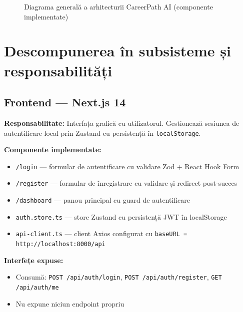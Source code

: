 \documentclass[12pt, a4paper]{report}
\begin{document}
\begin{figure}[H]
\caption{Diagrama generală a arhitecturii CareerPath AI (componente implementate)}
\end{figure}

\section{Descompunerea în subsisteme și responsabilități}

\subsection{Frontend — Next.js 14}

\textbf{Responsabilitate:} Interfața grafică cu utilizatorul. Gestionează sesiunea de
autentificare local prin Zustand cu persistență în \texttt{localStorage}.

\textbf{Componente implementate:}
\begin{itemize}[leftmargin=*]
  \item \texttt{/login} — formular de autentificare cu validare Zod + React Hook Form
  \item \texttt{/register} — formular de înregistrare cu validare și redirect post-succes
  \item \texttt{/dashboard} — panou principal cu guard de autentificare
  \item \texttt{auth.store.ts} — store Zustand cu persistență JWT în localStorage
  \item \texttt{api-client.ts} — client Axios configurat cu \texttt{baseURL = http://localhost:8000/api}
\end{itemize}

\textbf{Interfețe expuse:}
\begin{itemize}[leftmargin=*]
  \item Consumă: \texttt{POST /api/auth/login}, \texttt{POST /api/auth/register}, \texttt{GET /api/auth/me}
  \item Nu expune niciun endpoint propriu
\end{itemize}
\end{document}
